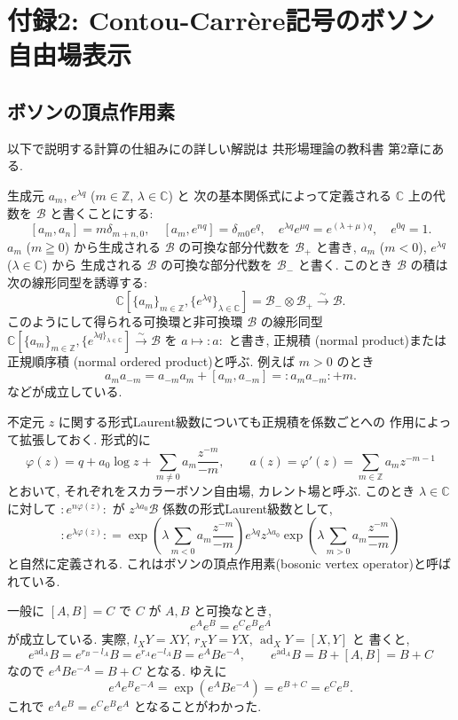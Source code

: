 \documentclass[12pt,twoside]{jarticle}
\newcommand\Z{{\mathbb Z}} %
\newcommand\C{{\mathbb C}} %
\theoremstyle{definition} %
\theoremstyle{definition} %
\theoremstyle{definition} %
\numberwithin{theorem}{section}
\numberwithin{equation}{section}
\numberwithin{figure}{section}
\numberwithin{table}{section}
\newcommand\B{{\mathcal B}}
\newcommand\isomto{\overset{\sim}{\to}}
\newcommand\np[1]{{:}{#1}{:}}
\newcommand\ad{\operatorname{\mathrm{ad}}}
\begin{document}
\section{付録2: Contou-Carr\`ere記号のボソン自由場表示}
\label{sec:CC-Heis}


\subsection{ボソンの頂点作用素}

以下で説明する計算の仕組みにの詳しい解説は
共形場理論の教科書 \cite{yamada} 第2章にある.

生成元 $a_m$, $e^{\lambda q}$ ($m\in\Z$, $\lambda\in\C$) と
次の基本関係式によって定義される $\C$ 上の代数を $\B$ と書くことにする:
\[
[a_m,a_n]=m\delta_{m+n,0}, \quad
[a_m,e^{nq}]=\delta_{m0}e^q, \quad
e^{\lambda q}e^{\mu q}=e^{(\lambda+\mu)q}, \quad
e^{0q}=1.
\]
$a_m$ ($m\geqq0$) から生成される $\B$ の可換な部分代数を $\B_+$ と書き,
$a_m$ ($m<0$), $e^{\lambda q}$ ($\lambda\in\C$) から
生成される $\B$ の可換な部分代数を $\B_-$ と書く.
このとき $\B$ の積は次の線形同型を誘導する:
\[
 \C[\{a_m\}_{m\in\Z}, \{e^{\lambda q}\}_{\lambda\in\C}]=
\B_-\otimes\B_+ \isomto \B.
\]
このようにして得られる可換環と非可換環 $\B$ の線形同型
$\C[\{a_m\}_{m\in\Z}, \{e^{\lambda q\}_{\lambda\in\C}}]\isomto\B$
を $a\mapsto \np{a}$ と書き, 正規積 (normal product)または
正規順序積 (normal ordered product)と呼ぶ. 例えば $m>0$ のとき
\[
 a_m a_{-m} = a_{-m}a_m + [a_m,a_{-m}]= \np{a_m a_{-m}} + m.
\]
などが成立している.

不定元 $z$ に関する形式Laurent級数についても正規積を係数ごとへの
作用によって拡張しておく. 形式的に
\[
\varphi(z) = q + a_0\log z + \sum_{m\ne 0}a_m\frac{z^{-m}}{-m},  \qquad
a(z)=\varphi'(z)=\sum_{m\in\Z} a_m z^{-m-1}
\]
とおいて, それぞれをスカラーボソン自由場, カレント場と呼ぶ.
このとき $\lambda\in\C$ に対して $\np{e^{n\varphi(z)}}$
が $z^{\lambda a_0}\B$ 係数の形式Laurent級数として,
\[
\np{e^{\lambda\varphi(z)}}=
\exp\left(\lambda\sum_{m<0}a_m\frac{z^{-m}}{-m}\right)
e^{\lambda q}
z^{\lambda a_0}
\exp\left(\lambda\sum_{m>0}a_m\frac{z^{-m}}{-m}\right)
\]
と自然に定義される.
これはボソンの頂点作用素(bosonic vertex operator)と呼ばれている.

一般に $[A,B]=C$ で $C$ が $A,B$ と可換なとき,
\[
e^A e^B = e^C e^B e^A
\]
が成立している. 実際, $l_X Y=XY$, $r_X Y=YX$, $\ad_X Y=[X,Y]$ と
書くと,
\[
e^{\ad_A} B = e^{r_B-l_A} B = e^{r_A}e^{-l_A} B = e^A B e^{-A}, \qquad
e^{\ad_A} B = B + [A,B] = B+C
\]
なので $e^A B e^{-A}=B+C$ となる. ゆえに
\[
e^A e^B e^{-A} = \exp(e^A B e^{-A}) = e^{B+C}=e^C e^B.
\]
これで $e^A e^B = e^C e^B e^A$ となることがわかった.
\end{document}
